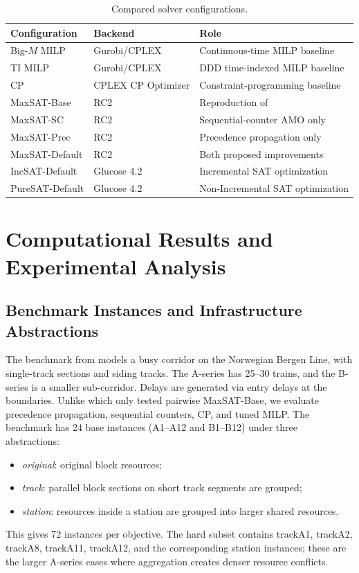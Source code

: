 \documentclass[runningheads]{llncs}
\begin{document}
\begin{table}[H]
\centering
\caption{Compared solver configurations.}
\label{tab:methods}
\scriptsize
\setlength{\tabcolsep}{5pt}
\renewcommand{\arraystretch}{1.0}
\begin{tabular}{lll}
\toprule
Configuration & Backend & Role \\
\midrule
Big-$M$ MILP & Gurobi/CPLEX & Continuous-time MILP baseline \\
TI MILP & Gurobi/CPLEX & DDD time-indexed MILP baseline \\
CP & CPLEX CP Optimizer & Constraint-programming baseline \\
MaxSAT-Base & RC2 & Reproduction of \cite{Croella2024} \\
MaxSAT-SC & RC2 & Sequential-counter AMO only \\
MaxSAT-Prec & RC2 & Precedence propagation only \\
MaxSAT-Default & RC2 & Both proposed improvements \\
IncSAT-Default & Glucose 4.2 & Incremental SAT optimization \\
PureSAT-Default & Glucose 4.2 & Non-Incremental SAT optimization \\
\bottomrule
\end{tabular}
\end{table}

\section{Computational Results and Experimental Analysis}
\label{sec:results}

\subsection{Benchmark Instances and Infrastructure Abstractions}

The benchmark from \cite{Croella2024} models a busy corridor on the Norwegian Bergen Line, with single-track sections and siding tracks. The A-series has 25--30 trains, and the B-series is a smaller sub-corridor. Delays are generated via entry delays at the boundaries. Unlike \cite{Croella2024} which only tested pairwise MaxSAT-Base, we evaluate precedence propagation, sequential counters, CP, and tuned MILP. The benchmark has 24 base instances (A1--A12 and B1--B12) under three abstractions:
\begin{itemize}
\item \emph{original}: original block resources;
\item \emph{track}: parallel block sections on short track segments are grouped;
\item \emph{station}: resources inside a station are grouped into larger shared
resources.
\end{itemize}
This gives 72 instances per objective. The hard subset contains trackA1,
trackA2, trackA8, trackA11, trackA12, and the corresponding station instances;
these are the larger A-series cases where aggregation creates denser resource
conflicts.
\end{document}
